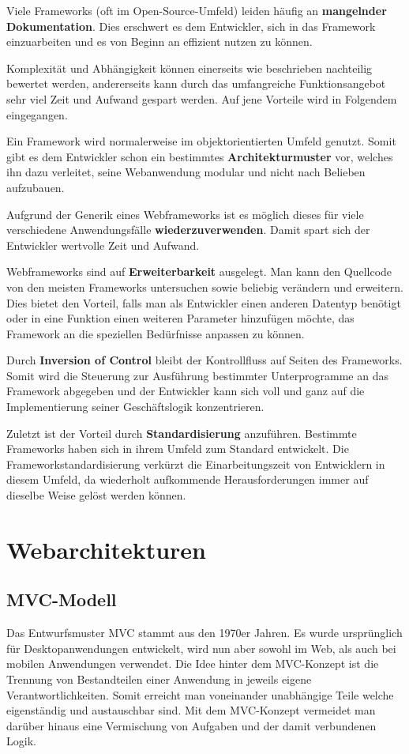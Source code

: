 Viele Frameworks (oft im Open-Source-Umfeld) leiden häufig an \textbf{mangelnder Dokumentation}. Dies erschwert es dem Entwickler, sich in das Framework einzuarbeiten und es von Beginn an effizient nutzen zu können.

Komplexität und Abhängigkeit können einerseits wie beschrieben nachteilig bewertet werden, andererseits kann durch das umfangreiche Funktionsangebot sehr viel Zeit und Aufwand gespart werden. Auf jene Vorteile wird in Folgendem eingegangen.

Ein Framework wird normalerweise im objektorientierten Umfeld genutzt. Somit gibt es dem Entwickler schon ein bestimmtes \textbf{Architekturmuster} vor, welches ihn dazu verleitet, seine Webanwendung modular und nicht nach Belieben aufzubauen.

Aufgrund der Generik eines Webframeworks ist es möglich dieses für viele verschiedene Anwendungsfälle \textbf{wiederzuverwenden}. Damit spart sich der Entwickler wertvolle Zeit und Aufwand.

Webframeworks sind auf \textbf{Erweiterbarkeit} ausgelegt. Man kann den Quellcode von den meisten Frameworks untersuchen sowie beliebig verändern und erweitern. Dies bietet den Vorteil, falls man als Entwickler einen anderen Datentyp benötigt oder in eine Funktion einen weiteren Parameter hinzufügen möchte, das Framework an die speziellen Bedürfnisse anpassen zu können.

Durch \textbf{Inversion of Control} bleibt der Kontrollfluss auf Seiten des Frameworks. Somit wird die Steuerung zur Ausführung bestimmter Unterprogramme an das Framework abgegeben und der Entwickler kann sich voll und ganz auf die Implementierung seiner Geschäftslogik konzentrieren.

Zuletzt ist der Vorteil durch \textbf{Standardisierung} anzuführen. Bestimmte Frameworks haben sich in ihrem Umfeld zum Standard entwickelt. Die Frameworkstandardisierung verkürzt die Einarbeitungszeit von Entwicklern in diesem Umfeld, da wiederholt aufkommende Herausforderungen immer auf dieselbe Weise gelöst werden können.\autocites[vgl.][313\psqq]{Schatten2010}


\section{Webarchitekturen}\label{sec:webarchitekturen}

\subsection{MVC-Modell}\label{MVC}
Das Entwurfsmuster MVC stammt aus den 1970er Jahren. Es wurde ursprünglich für Desktopanwendungen entwickelt, wird nun aber sowohl im Web, als auch bei mobilen Anwendungen verwendet. Die Idee hinter dem MVC-Konzept ist die Trennung von Bestandteilen einer Anwendung in jeweils eigene Verantwortlichkeiten. Somit erreicht man voneinander unabhängige Teile welche eigenständig und austauschbar sind. Mit dem MVC-Konzept vermeidet man darüber hinaus eine Vermischung von Aufgaben und der damit verbundenen Logik.\autocites[vgl.][7\psqq]{Steyer2017}

